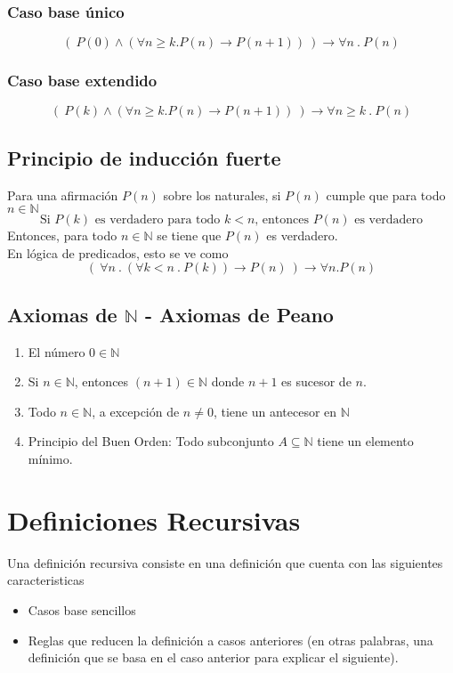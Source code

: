 \documentclass[../main.tex]{subfiles}
\begin{document}
\subsubsection{Caso base único}
\[ (\ P(0) \wedge ( \forall n \geq k . P(n) \rightarrow P(n + 1) )\ ) \rightarrow \forall n\ .\ P(n) \]

\subsubsection{Caso base extendido}
\[ (\ P(k) \wedge ( \forall n \geq k . P(n) \rightarrow P(n + 1) )\ ) \rightarrow \forall n \geq k\ .\ P(n) \]


\subsection{Principio de inducción fuerte}
Para una afirmación $P(n)$ sobre los naturales, si $P(n)$ cumple que para todo $n \in \mathds{N}$
\[ \text{Si } P(k) \text{ es verdadero para todo } k < n \text{, entonces } P(n) \text{ es verdadero} \]
Entonces, para todo $n \in \mathds{N}$ se tiene que $P(n)$ es verdadero.\\
En lógica de predicados, esto se ve como
\[ (\ \forall n\ .\ (\forall k < n\ .\ P(k)) \rightarrow P(n) \ ) \rightarrow \forall n . P(n) \]

\subsection[Axiomas de Peano]{Axiomas de $\mathds{N}$ - Axiomas de Peano}
\begin{enumerate}
    \item El número $0 \in \mathds{N}$
    \item Si $n \in \mathds{N}$, entonces $(n + 1) \in \mathds{N}$ donde $n + 1$ es sucesor de $n$.
    \item Todo $n \in \mathds{N}$, a excepción de $n \not= 0$, tiene un antecesor en $\mathds{N}$
    \item Principio del Buen Orden: Todo subconjunto $A \subseteq \mathds{N}$ tiene un elemento mínimo.
\end{enumerate}

\section{Definiciones Recursivas}
Una definición recursiva consiste en una definición que cuenta con las siguientes caracteristicas
\begin{itemize}
    \item Casos base sencillos
    \item Reglas que reducen la definición a casos anteriores (en otras palabras, una definición que se basa en el caso anterior para explicar el siguiente).
\end{itemize}
\end{document}
